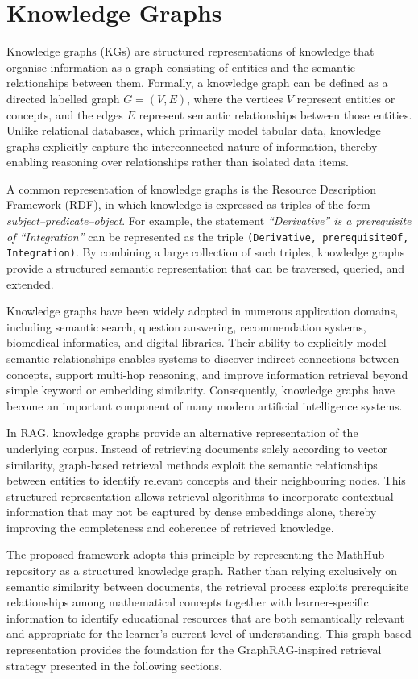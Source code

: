 \section{Knowledge Graphs}

Knowledge graphs (KGs) are structured representations of knowledge that organise information as a graph consisting of entities and the semantic relationships between them. Formally, a knowledge graph can be defined as a directed labelled graph \(G=(V,E)\), where the vertices \(V\) represent entities or concepts, and the edges \(E\) represent semantic relationships between those entities. Unlike relational databases, which primarily model tabular data, knowledge graphs explicitly capture the interconnected nature of information, thereby enabling reasoning over relationships rather than isolated data items.

A common representation of knowledge graphs is the Resource Description Framework (RDF), in which knowledge is expressed as triples of the form \textit{subject--predicate--object}. For example, the statement \emph{``Derivative'' is a prerequisite of ``Integration''} can be represented as the triple \texttt{(Derivative, prerequisiteOf, Integration)}. By combining a large collection of such triples, knowledge graphs provide a structured semantic representation that can be traversed, queried, and extended.

Knowledge graphs have been widely adopted in numerous application domains, including semantic search, question answering, recommendation systems, biomedical informatics, and digital libraries. Their ability to explicitly model semantic relationships enables systems to discover indirect connections between concepts, support multi-hop reasoning, and improve information retrieval beyond simple keyword or embedding similarity. Consequently, knowledge graphs have become an important component of many modern artificial intelligence systems.

In RAG, knowledge graphs provide an alternative representation of the underlying corpus. Instead of retrieving documents solely according to vector similarity, graph-based retrieval methods exploit the semantic relationships between entities to identify relevant concepts and their neighbouring nodes. This structured representation allows retrieval algorithms to incorporate contextual information that may not be captured by dense embeddings alone, thereby improving the completeness and coherence of retrieved knowledge.


The proposed framework adopts this principle by representing the MathHub repository as a structured knowledge graph. Rather than relying exclusively on semantic similarity between documents, the retrieval process exploits prerequisite relationships among mathematical concepts together with learner-specific information to identify educational resources that are both semantically relevant and appropriate for the learner's current level of understanding. This graph-based representation provides the foundation for the GraphRAG-inspired retrieval strategy presented in the following sections.
